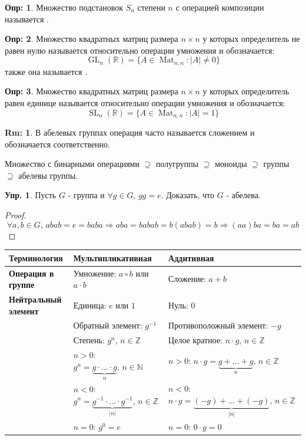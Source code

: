 \documentclass[12pt]{article}
\newcommand{\MR}{\mathbb{R}}
\newcommand{\MN}{\mathbb{N}}
\newcommand{\MZ}{\mathbb{Z}}
\theoremstyle{definition}
\newtheorem{defn}{Опр:}
\newtheorem{rem}{Rm:}
\newtheorem{exrc}{Упр.}
\newcommand{\mat}[2]{\operatorname{Mat}_{#1, #2}}
\DeclareMathOperator{\GL}{\operatorname{GL}}
\DeclareMathOperator{\SL}{\operatorname{SL}}
\begin{document}
\begin{defn}
	 Множество подстановок $S_n$ степени $n$ с операцией композиции называется .
\end{defn}
\begin{defn}
	Множество квадратных матриц размера $n\times n$ у которых определитель не равен нулю называется  относительно операции умножения и обозначается:
	$$
		\GL_n(\MR) = \{A \in \mat{n}{n} \colon |A| \neq 0\}
	$$
	также она называется .
\end{defn}
\begin{defn}
	Множество квадратных матриц размера $n\times n$ у которых определитель равен единице называется  относительно операции умножения и обозначается:
	$$
		\SL_n(\MR) = \{A \in \mat{n}{n} \colon |A| = 1\}
	$$
\end{defn}

\begin{rem}
	В абелевых группах операция часто называется сложением и обозначается соответственно.
\end{rem}

Множество с бинарными операциями $\supseteq$ полугруппы $\supseteq$ моноиды $\supseteq$ группы $\supseteq$ абелевы группы.

\newpage
\begin{exrc}
	Пусть $G$ - группа и $\forall g \in G, \, gg = e$. Доказать, что $G$ - абелева.
\end{exrc}
\begin{proof}
	$$
		\forall a, b \in G, \, abab = e = baba \Rightarrow aba = babab = b(abab) = b \Rightarrow (aa)ba = ba = ab 
	$$
\end{proof}

\begin{center}
	\begin{tabular}{ | m{5cm} || m{6cm}| m{7cm} | } 
		\hline
		\textbf{Терминология} & \textbf{Мультипликативная} & \textbf{Аддитивная}\\ [0.5ex]
		\hline\hline
		\textbf{Операция в группе} & Умножение: $a\circ b$ или $a{\cdot}b$ & Сложение: $a + b$ \\ 
		\hline
		\textbf{Нейтральный элемент} & Единица: $e$ или $1$ & Нуль: $0$\\ 
		\hline
		& Обратный элемент: $g^{-1}$ & Противоположный элемент: $-g$\\
		\hline
		& Степень: $g^n, \, n \in \MZ$ & Целое кратное: $n{\cdot}g, \, n \in \MZ$ \\[0.5ex]
		& $n > 0$: $g^n = \underbrace{g{\cdot}\dotsc{\cdot}g}_{n}, \, n \in \MN$ 
		& $n > 0$: $n{\cdot}g = \underbrace{g + \dotsc + g}_{n}, \, n \in \MZ$ \\[4ex]
		& $n < 0$: $g^n = \underbrace{g^{-1}{\cdot}\dotsc{\cdot}g^{-1}}_{|n|}, \, n \in \MZ$ 
		& $n < 0$: $n{\cdot}g = \underbrace{(-g) + \dotsc + (-g)}_{|n|}, \, n \in \MZ$ \\[4ex]
		& $n = 0$: $g^0 = e$ & $n = 0$: $0{\cdot}g = 0$ \\[0.5ex]
		\hline
	\end{tabular}
\end{center}
\end{document}
